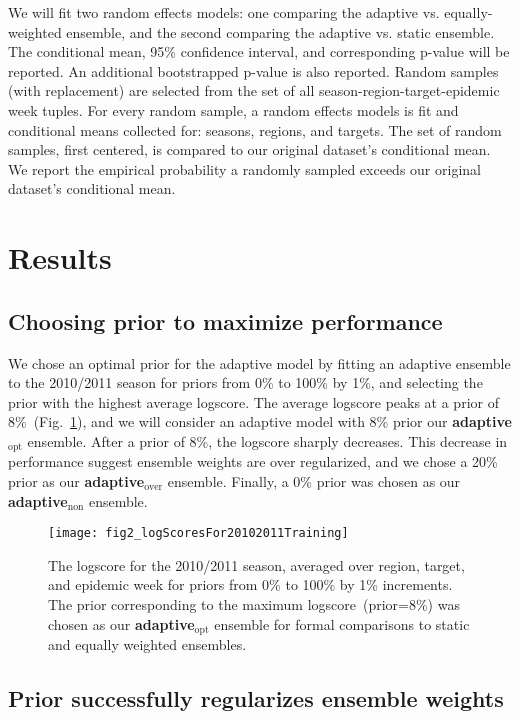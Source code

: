 \documentclass[12pt]{article}
\def\adaptNon{\textbf{adaptive$_{\text{non}}$ }}
\def\adaptOpt{\textbf{adaptive$_{\text{opt}}$ }}
\def\adaptOver{\textbf{adaptive$_{\text{over}}$ }}
\begin{document}
We will fit two random effects models: one comparing the adaptive vs. equally-weighted ensemble, and the second comparing the adaptive vs. static ensemble.
The conditional mean, 95\% confidence interval, and corresponding p-value will be reported.
An additional bootstrapped p-value is also reported.
Random samples (with replacement) are selected from the set of all season-region-target-epidemic week tuples.
For every random sample, a random effects models is fit and conditional means collected for: seasons, regions, and targets. 
The set of random samples, first centered, is compared to our original dataset's conditional mean.
We report the empirical probability a randomly sampled exceeds our original dataset's conditional mean.

\section{Results}

\subsection{Choosing prior to maximize performance}

We chose an optimal prior for the adaptive model by fitting an adaptive ensemble to the 2010/2011 season for priors from 0\% to 100\% by 1\%, and selecting the prior with the highest average logscore.
The average logscore peaks at a prior of 8\%~(Fig.~\ref{fig2.prespecifiedLogScorePlot}), and we will consider an adaptive model with 8\% prior our \adaptOpt ensemble.
After a prior of 8\%, the logscore sharply decreases.
This decrease in performance suggest ensemble weights are over regularized, and we chose a 20\% prior as our \adaptOver ensemble.
Finally, a 0\% prior was chosen as our \adaptNon ensemble.

\graphicspath{{../_6_TLGs/_G/fig2_logScoresFor20102011Training/}}
\begin{figure}[ht!]
  \centering
  \texttt{[image: fig2\_logScoresFor20102011Training]}
  \caption{ The logscore for the 2010/2011 season, averaged over region, target, and epidemic week for priors from 0\% to 100\% by 1\% increments.
   The prior corresponding to the maximum logscore~(prior=8\%) was chosen as our \adaptOpt ensemble for formal comparisons to static and equally weighted ensembles. \label{fig2.prespecifiedLogScorePlot}}
\end{figure}

\subsection{Prior successfully regularizes ensemble weights} 
\end{document}
